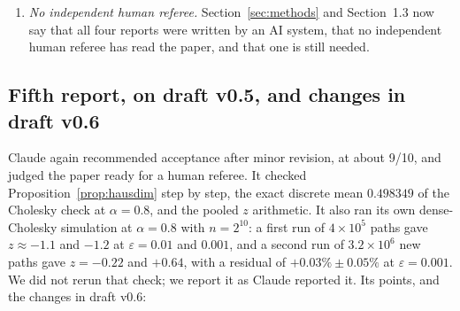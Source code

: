 \documentclass[11pt]{article}
\theoremstyle{remark}
\theoremstyle{definition}
\begin{document}
\begin{enumerate}
\item \emph{No independent human referee.} Section~\ref{sec:methods} and Section~1.3 now say that all four reports were written by an AI system, that no independent human referee has read the paper, and that one is still needed.
\end{enumerate}

\subsection{Fifth report, on draft v0.5, and changes in draft v0.6}\label{app:referee5}
Claude again recommended acceptance after minor revision, at about 9/10, and judged the paper ready for a human referee. It checked Proposition~\ref{prop:hausdim} step by step, the exact discrete mean $0.498349$ of the Cholesky check at $\alpha=0.8$, and the pooled $z$ arithmetic. It also ran its own dense-Cholesky simulation at $\alpha=0.8$ with $n=2^{10}$: a first run of $4\times10^5$ paths gave $z\approx-1.1$ and $-1.2$ at $\varepsilon=0.01$ and $0.001$, and a second run of $3.2\times10^6$ new paths gave $z=-0.22$ and $+0.64$, with a residual of $+0.03\%\pm0.05\%$ at $\varepsilon=0.001$. We did not rerun that check; we report it as Claude reported it. Its points, and the changes in draft v0.6:
\end{document}
